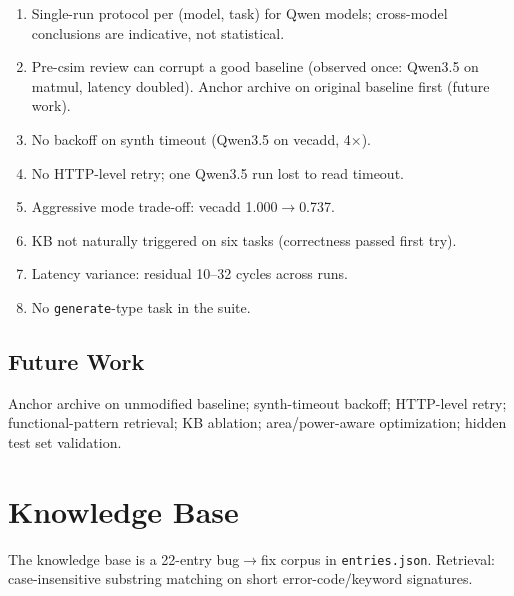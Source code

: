\documentclass[10pt,conference,letterpaper]{IEEEtran}
\begin{document}
\begin{enumerate}
    \item Single-run protocol per (model, task) for Qwen models; cross-model conclusions are indicative, not statistical.
    \item Pre-csim review can corrupt a good baseline (observed once: Qwen3.5 on matmul, latency doubled). Anchor archive on original baseline first (future work).
    \item No backoff on synth timeout (Qwen3.5 on vecadd, 4$\times$).
    \item No HTTP-level retry; one Qwen3.5 run lost to read timeout.
    \item Aggressive mode trade-off: vecadd 1.000$\to$0.737.
    \item KB not naturally triggered on six tasks (correctness passed first try).
    \item Latency variance: residual 10--32 cycles across runs.
    \item No \texttt{generate}-type task in the suite.
\end{enumerate}

\subsection{Future Work}

Anchor archive on unmodified baseline; synth-timeout backoff; HTTP-level retry; functional-pattern retrieval; KB ablation; area/power-aware optimization; hidden test set validation.

\section{Knowledge Base}
\label{app:kb}

The knowledge base is a 22-entry bug$\to$fix corpus in \texttt{entries.json}. Retrieval: case-insensitive substring matching on short error-code/keyword signatures.
\end{document}
